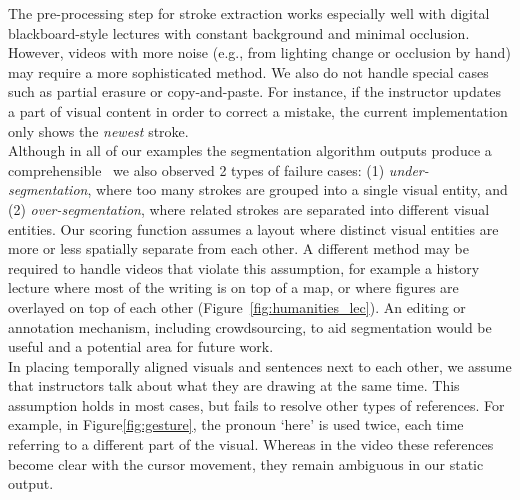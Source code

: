 The pre-processing step for stroke extraction works especially well with digital blackboard-style lectures with constant background and minimal occlusion. However, videos with more noise (e.g., from lighting change or occlusion by hand) may require a more sophisticated method. We also do not handle special cases
such as partial erasure or copy-and-paste.  For instance, if the instructor
updates a part of visual content in order to correct a mistake, the current
implementation only shows the \textit{newest} stroke.\\

Although in all of our examples the segmentation algorithm outputs produce a comprehensible \systemname\, we also observed 2 types of failure cases: (1) \textit{under-segmentation}, where too many strokes are grouped into a single visual entity, and (2) \textit{over-segmentation}, where related strokes are separated into different visual entities. Our scoring function assumes a layout where distinct visual entities are more or less spatially separate from each other. A different method may be required to handle videos that violate this assumption, for example a history lecture where most of the writing is on top of a map, or where figures are overlayed on top of each other (Figure~\ref{fig:humanities_lec}).  An editing or annotation mechanism, including crowdsourcing, to aid segmentation would be useful and a potential area for future work.\\

In placing temporally aligned visuals and sentences next to each other, we assume that instructors talk about what they are drawing at the same time. This assumption holds in most cases, but fails to resolve other types of references. For example, in Figure\ref{fig:gesture}, the pronoun `here' is used twice, each time referring to a different part of the visual. Whereas in the video these references become clear with the cursor movement, they remain ambiguous in our static output.


